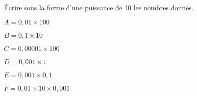 
Écrire sous la forme d'une puissance de 10 les nombres donnés.

\begin{enumerate}
\begin{minipage}{0.49\linewidth}
\item $A=0,01 \times 100$
\item $B=0,1 \times 10 $
\item $C=0,00001 \times 100 $ 
\end{minipage}
\hfill
\begin{minipage}{0.49\linewidth}
\item $D=0,001 \times 1$
\item $E=0,001 \times 0,1$ 
\item $F=0,01 \times 10 \times 0,001$ 
\end{minipage}
\end{enumerate}